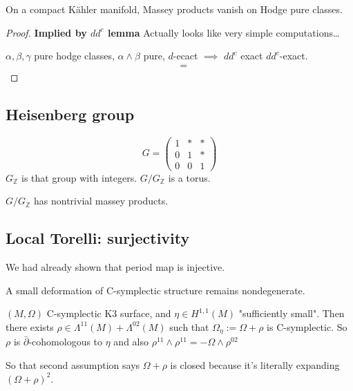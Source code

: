 \begin{thm}\leavevmode
	 On a compact Kähler manifold, Massey products vanish on Hodge pure classes.
\end{thm}

\begin{proof}\leavevmode
\textbf{Implied by $d d^c$ lemma} 	Actually looks like very simple computations…

	$\alpha, \beta, \gamma$ pure hodge classes, $\alpha\wedge \beta$ pure, $d$-ecact  $\implies $ $d d^c$ exact $d d^c$-exact.
	\begin{align*}
		&=
	\end{align*}
\end{proof}

\subsection{Heisenberg group}

\begin{defn}\leavevmode
	\[G=\begin{pmatrix}1&*&*\\ 0&1&*\\ 0&0&1\end{pmatrix}\]
	$G_{\mathbb{Z}}$ is that group with integers. $G/G_\mathbb{Z}$ is a torus.
\end{defn}

\begin{thm}\leavevmode
	$G/G_\mathbb{Z}$ has nontrivial massey products.
\end{thm}

\subsection{Local Torelli: surjectivity}

We had already shown that period map is injective.

\begin{thm}\leavevmode
	A small deformation of C-symplectic structure remains nondegenerate.

	$(M,\Omega)$ C-symplectic K3 surface, and $\eta\in H^{1,1}(M)$ "sufficiently small". Then there exists $\rho \in\Lambda^{11}(M)+\Lambda^{02}(M)$ such that $\Omega_\eta :=\Omega+\rho$ is C-symplectic. So $\rho$ is $\bar\partial$-cohomologous to $\eta$ and also $\rho^{11}\wedge \rho^{11}=-\Omega\wedge \rho^{02}$\end{thm}

	So that second assumption says $\Omega+\rho$ is closed because it's literally expanding $(\Omega+\rho)^2$.

